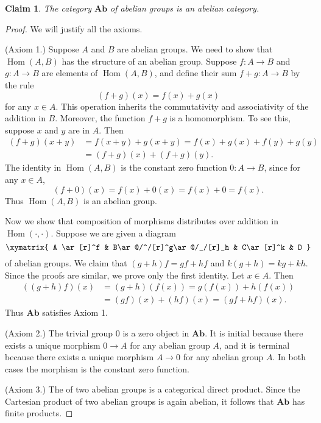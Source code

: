 \documentclass[12pt]{article}
\newcommand{\Ab}{\mathbf{Ab}}
\DeclareMathOperator{\Hom}{Hom}
\newtheorem*{claim*}{Claim}
\begin{document}

\begin{claim*}
The category $\Ab$ of abelian groups is an abelian category.
\end{claim*}

\begin{proof}
We will justify all the axioms.

(Axiom 1.)  Suppose $A$ and $B$ are abelian groups.  We need to show that $\Hom(A,B)$ has the structure of an abelian group.  Suppose $f\colon A\to B$ and $g\colon A\to B$ are elements of $\Hom(A,B)$, and define their sum $f+g\colon A\to B$ by the rule
\[
(f+g)(x) = f(x) + g(x)
\]
for any $x\in A$.  This operation inherits the commutativity and associativity of the addition in $B$.  Moreover, the function $f+g$ is a homomorphism.  To see this, suppose $x$ and $y$ are in $A$.  Then
\begin{align*}
(f+g)(x+y) &= f(x+y) + g(x+y) = f(x) + g(x) + f(y) + g(y) \\
           &= (f+g)(x) + (f+g)(y).
\end{align*}
The identity in $\Hom(A,B)$ is the constant zero function $0\colon A\to B$, since for any $x\in A$, 
\[
(f+0)(x) = f(x) + 0(x) = f(x) + 0 = f(x).
\]
Thus $\Hom(A,B)$ is an abelian group.  

Now we show that composition of morphisms distributes over addition in $\Hom(\cdot,\cdot)$.  Suppose we are given a diagram
\[\xymatrix{
A \ar[r]^f & B\ar@/^/[r]^g\ar@/_/[r]_h & C\ar[r]^k & D
}\]
of abelian groups.  We claim that $(g+h)f = gf+hf$ and $k(g+h) = kg+kh$.  Since the proofs are similar, we prove only the first identity.  Let $x\in A$.  Then
\begin{align*}
((g+h)f)(x) &= (g+h)(f(x)) = g(f(x)) + h(f(x)) \\
            &= (gf)(x) + (hf)(x) = (gf+hf)(x).
\end{align*}
Thus $\Ab$ satisfies Axiom 1.

(Axiom 2.)  The trivial group $0$ is a zero object in $\Ab$.  It is initial because there exists a unique morphism $0\to A$ for any abelian group $A$, and it is terminal because there exists a unique morphism $A\to 0$ for any abelian group $A$.  In both cases the morphism is the constant zero function.

(Axiom 3.)  The  of two abelian groups is a categorical direct product.  Since the Cartesian product of two abelian groups is again abelian, it follows that $\Ab$ has finite products.


\end{proof}
\end{document}

